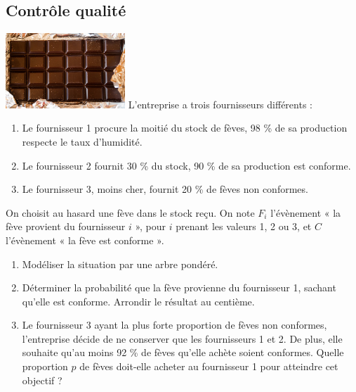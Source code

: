 \documentclass[a4paper,11pt,exos]{nsi} %
\begin{document}
\maketitle

\subsection*{Contrôle qualité}
{\includegraphics[width=4.5cm]{chocolate-1277002_640.jpg}}
L’entreprise a trois fournisseurs différents :
\begin{enumerate}[label=\textbullet]
    \item Le fournisseur 1 procure la moitié du stock de fèves, 98 \% de sa production respecte le taux d’humidité.
    \item Le fournisseur 2 fournit 30 \% du stock, 90 \% de sa production est conforme.
    \item Le fournisseur 3, moins cher, fournit 20 \% de fèves non conformes.
\end{enumerate}

On choisit au hasard une fève dans le stock reçu. On note $F_i$
l’évènement « la fève provient du fournisseur $i$ », pour $i$ prenant les valeurs 1, 2 ou 3, et $C$ l’évènement « la fève est conforme ».
\begin{enumerate}
    \item Modéliser la situation par une arbre pondéré.
    \item Déterminer la probabilité que la fève provienne du fournisseur 1, sachant qu’elle est conforme. Arrondir le résultat au centième.
    \item Le fournisseur 3 ayant la plus forte proportion de fèves non conformes, l’entreprise décide de ne conserver que les fournisseurs 1 et 2. De plus, elle souhaite qu'au moins 92 \% de fèves qu’elle achète soient conformes. Quelle proportion $p$ de fèves doit-elle
    acheter au fournisseur 1 pour atteindre cet objectif ?
\end{enumerate}
\end{document}

